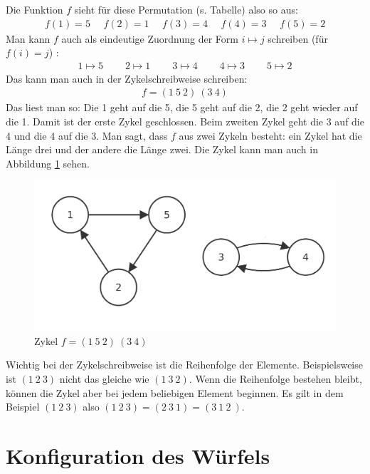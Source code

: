 \documentclass[12pt,a4paper, usenames, dvipsnames]{article}
\begin{document}
Die Funktion $f$ sieht für diese Permutation (s. Tabelle) also so aus:
\begin{align*}
f(1) = 5 \ \ \ \ \ \  f(2) = 1 \ \ \ \ \ \ f(3) = 4 \ \ \ \ \ \ f(4) = 3 \ \ \ \ \ \ f(5) = 2 
\end{align*}
Man kann $f$ auch als eindeutige Zuordnung der Form $i \mapsto j$ schreiben (für $f(i)=j$) \cite{JC}:
\begin{align*}
1 \mapsto 5 \ \ \ \ \ \ \ \ \ \  2\mapsto 1 \ \ \ \ \ \ \ \ \ \ 3\mapsto 4 \ \ \ \ \ \ \ \ \ \ 4\mapsto 3 \ \ \ \ \ \ \ \ \ \ 5\mapsto 2 
\end{align*}
Das kann man auch in der Zykelschreibweise schreiben:
\begin{align*}
f = (1 \ 5 \ 2)\ (3 \ 4)
\end{align*}
Das liest man so: Die 1 geht auf die 5, die 5 geht auf die 2, die 2 geht wieder auf die 1. Damit ist der erste Zykel geschlossen. Beim zweiten Zykel geht die 3 auf die 4 und die 4 auf die 3. Man sagt, dass $f$ aus zwei Zykeln besteht: ein Zykel hat die Länge drei und der andere die Länge zwei. Die Zykel kann man auch in Abbildung \ref{10} sehen.
\begin{figure}[h]
\centering
\includegraphics[scale=0.13]{Zykel_152.png}
\caption{Zykel $f = (1 \ 5 \ 2)\ (3 \ 4)$}
\label{10}
\end{figure}
Wichtig bei der Zykelschreibweise ist die Reihenfolge der Elemente. Beispielsweise ist $(1 \ 2 \ 3)$ nicht das gleiche wie $(1 \ 3 \ 2)$. Wenn die Reihenfolge bestehen bleibt, können die Zykel aber bei jedem beliebigen Element beginnen. Es gilt in dem Beispiel $(1 \ 2 \ 3)$ also $(1 \ 2 \ 3) = (2 \ 3 \ 1) = (3\ 1 \ 2 \ )$.


%
%
%
%
%
%
%
%
%
%
\newpage

\section{Konfiguration des Würfels}
\end{document}
